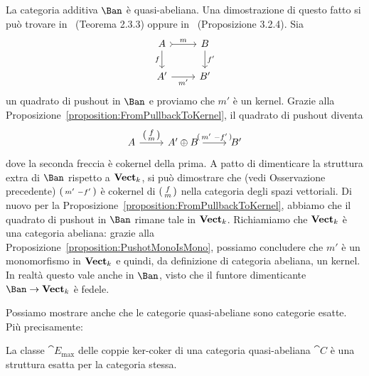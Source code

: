 \begin{example}
  La categoria additiva \(\Ban\) è quasi-abeliana. Una dimostrazione di
  questo fatto si può trovare in~\cite{buehler:boundedcohomology}
  (Teorema 2.3.3) oppure in~\cite{schneiders:quasi-abelian}
  (Proposizione 3.2.4). Sia
  \[
    \begin{tikzcd}
      A \ar["{f}", d, swap] \ar["{m}", rightarrowtail, r] & B \ar["{f'}", d] \\
      A' \ar["{m'}", r, swap] & B'
    \end{tikzcd}
  \]
  un quadrato di pushout in \(\Ban\) e proviamo che \(m'\) è un
  kernel. Grazie alla
  Proposizione~\ref{proposition:FromPullbackToKernel}, il quadrato di
  pushout diventa
  \[
    \begin{tikzcd}[ampersand replacement=\&]
      A \ar["{\begin{psmallmatrix} f \\ m \end{psmallmatrix}}", r] \& A'
      \oplus B \ar["{\begin{psmallmatrix} m' & -f' \end{psmallmatrix}}", r]
      \& B'
    \end{tikzcd}
  \]
  dove la seconda freccia è cokernel della prima. A patto di dimenticare
  la struttura extra di \(\Ban\) rispetto a \(\mathbf{Vect}_k\), si può
  dimostrare che (vedi Osservazione precedente)
  \(\begin{psmallmatrix} m' & -f' \end{psmallmatrix}\) è cokernel di
  \(\begin{psmallmatrix} f \\ m \end{psmallmatrix}\) nella categoria
  degli spazi vettoriali. Di nuovo per la
  Proposizione~\ref{proposition:FromPullbackToKernel}, abbiamo che il
  quadrato di pushout in \(\Ban\) rimane tale in
  \(\mathbf{Vect}_k\). Richiamiamo che \(\mathbf{Vect}_k\) è una categoria abeliana:
  grazie alla Proposizione~\ref{proposition:PushotMonoIsMono}, possiamo
  concludere che \(m'\) è un monomorfismo in \(\mathbf{Vect}_k\) e quindi, da
  definizione di categoria abeliana, un kernel. In realtà questo vale
  anche in \(\Ban\), visto che il funtore dimenticante
  \(\Ban \to \Vect_k\) è fedele.
\end{example}

Possiamo mostrare anche che le categorie quasi-abeliane sono categorie
esatte. Più precisamente:

\begin{proposition}
  La classe \(\cat E_{\max}\) delle coppie ker-coker di una categoria
  quasi-abeliana \(\cat C\) è una struttura esatta per la categoria
  stessa.
\end{proposition}

